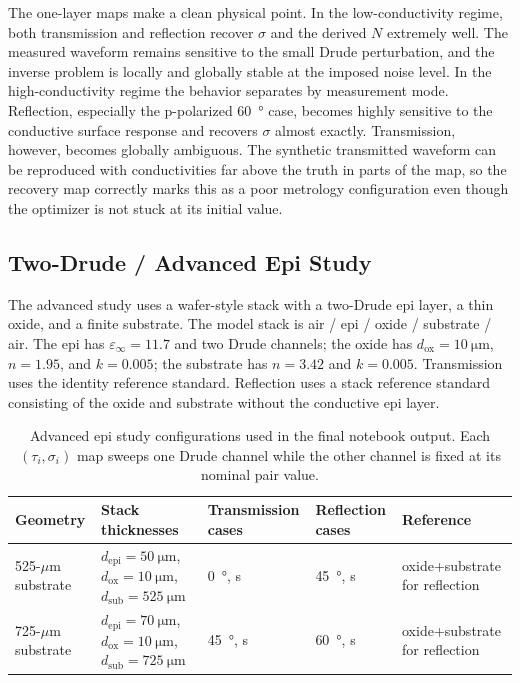\documentclass[11pt]{article}
\begin{document}
The one-layer maps make a clean physical point. In the low-conductivity regime, both transmission and reflection recover \(\sigma\) and the derived \(N\) extremely well. The measured waveform remains sensitive to the small Drude perturbation, and the inverse problem is locally and globally stable at the imposed noise level. In the high-conductivity regime the behavior separates by measurement mode. Reflection, especially the p-polarized \SI{60}{\degree} case, becomes highly sensitive to the conductive surface response and recovers \(\sigma\) almost exactly. Transmission, however, becomes globally ambiguous. The synthetic transmitted waveform can be reproduced with conductivities far above the truth in parts of the map, so the recovery map correctly marks this as a poor metrology configuration even though the optimizer is not stuck at its initial value.

\subsection{Two-Drude / Advanced Epi Study}

The advanced study uses a wafer-style stack with a two-Drude epi layer, a thin oxide, and a finite substrate. The model stack is air / epi / oxide / substrate / air. The epi has \(\varepsilon_\infty=11.7\) and two Drude channels; the oxide has \(d_{\mathrm{ox}}=\SI{10}{\micro\meter}\), \(n=1.95\), and \(k=0.005\); the substrate has \(n=3.42\) and \(k=0.005\). Transmission uses the identity reference standard. Reflection uses a stack reference standard consisting of the oxide and substrate without the conductive epi layer.

\begin{table}[htbp]
\centering
\begin{threeparttable}
\caption{Advanced epi study configurations used in the final notebook output. Each \((\tau_i,\sigma_i)\) map sweeps one Drude channel while the other channel is fixed at its nominal pair value.}
\label{tab:advanced-stack-results}
\small
\begin{tabularx}{\linewidth}{@{}p{2.8cm}p{4.8cm}p{1.9cm}p{1.9cm}Y@{}}
\toprule
Geometry & Stack thicknesses & Transmission cases & Reflection cases & Reference \\
-\(\mu\)m substrate & \(d_{\mathrm{epi}}=\SI{50}{\micro\meter}\), \(d_{\mathrm{ox}}=\SI{10}{\micro\meter}\), \(d_{\mathrm{sub}}=\SI{525}{\micro\meter}\) & \SI{0}{\degree}, s & \SI{45}{\degree}, s & oxide+substrate for reflection \\
725-\(\mu\)m substrate & \(d_{\mathrm{epi}}=\SI{70}{\micro\meter}\), \(d_{\mathrm{ox}}=\SI{10}{\micro\meter}\), \(d_{\mathrm{sub}}=\SI{725}{\micro\meter}\) & \SI{45}{\degree}, s & \SI{60}{\degree}, s & oxide+substrate for reflection \\
\bottomrule
\end{tabularx}
\end{threeparttable}
\end{table}
\end{document}
